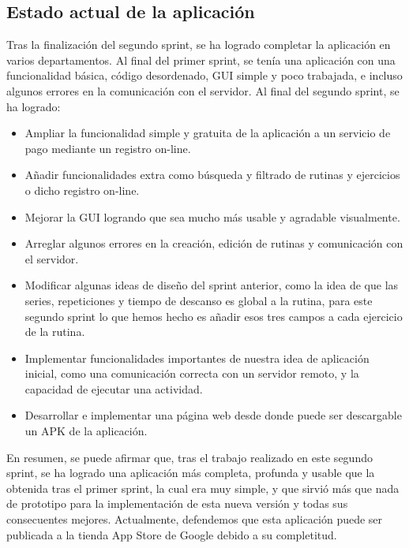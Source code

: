 \documentclass[11pt,a4paper]{report}
\begin{document}
\subsection{Estado actual de la aplicación}
Tras la finalización del segundo sprint, se ha logrado completar la aplicación en varios departamentos. Al final del primer sprint, se tenía una aplicación con una funcionalidad básica, código desordenado, GUI simple y poco trabajada, e incluso algunos errores en la comunicación con el servidor. Al final del segundo sprint, se ha logrado:
\begin{itemize}
	\item Ampliar la funcionalidad simple y gratuita de la aplicación a un servicio de pago mediante un registro on-line.

	\item Añadir funcionalidades extra como búsqueda y filtrado de rutinas y ejercicios o dicho registro on-line.

	\item Mejorar la GUI logrando que sea mucho más usable y agradable visualmente.

	\item Arreglar algunos errores en la creación, edición de rutinas y comunicación con el servidor.

	\item Modificar algunas ideas de diseño del sprint anterior, como la idea de que las series, repeticiones y tiempo de descanso es global a la rutina, para este segundo sprint lo que hemos hecho es añadir esos tres campos a cada ejercicio de la rutina.

	\item Implementar funcionalidades importantes de nuestra idea de aplicación inicial, como una comunicación correcta con un servidor remoto, y la capacidad de ejecutar una actividad.

	\item Desarrollar e implementar una página web desde donde puede ser descargable un APK de la aplicación.

\end{itemize}
En resumen, se puede afirmar que, tras el trabajo realizado en este segundo sprint, se ha logrado una aplicación más completa, profunda y usable que la obtenida tras el primer sprint, la cual era muy simple, y que sirvió más que nada de prototipo para la implementación de esta nueva versión y todas sus consecuentes mejores. Actualmente, defendemos que esta aplicación puede ser publicada a la tienda App Store de Google debido a su completitud.
\end{document}
